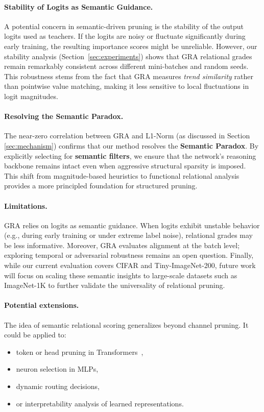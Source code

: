 \documentclass[sn-mathphys,Numbered]{sn-jnl}
\begin{document}
\paragraph{Stability of Logits as Semantic Guidance.}
A potential concern in semantic-driven pruning is the stability of the output logits used as teachers. If the logits are noisy or fluctuate significantly during early training, the resulting importance scores might be unreliable. However, our stability analysis (Section~\ref{sec:experiments}) shows that GRA relational grades remain remarkably consistent across different mini-batches and random seeds. This robustness stems from the fact that GRA measures \emph{trend similarity} rather than pointwise value matching, making it less sensitive to local fluctuations in logit magnitudes.

\paragraph{Resolving the Semantic Paradox.}
The near-zero correlation between GRA and L1-Norm (as discussed in Section \ref{sec:mechanism}) confirms that our method resolves the \textbf{Semantic Paradox}. By explicitly selecting for \textbf{semantic filters}, we ensure that the network's reasoning backbone remains intact even when aggressive structural sparsity is imposed. This shift from magnitude-based heuristics to functional relational analysis provides a more principled foundation for structured pruning.

\paragraph{Limitations.}
GRA relies on logits as semantic guidance.
When logits exhibit unstable behavior (e.g., during early training or under extreme label noise), relational grades may be less informative.
Moreover, GRA evaluates alignment at the batch level; exploring temporal or adversarial robustness remains an open question.
Finally, while our current evaluation covers CIFAR and Tiny-ImageNet-200, future work will focus on scaling these semantic insights to large-scale datasets such as ImageNet-1K to further validate the universality of relational pruning.

\paragraph{Potential extensions.}
The idea of semantic relational scoring generalizes beyond channel pruning.
It could be applied to:
\begin{itemize}
    \item token or head pruning in Transformers~\cite{xia2022structured,khaki2024need},
    \item neuron selection in MLPs,
    \item dynamic routing decisions,
    \item or interpretability analysis of learned representations.
\end{itemize}
\end{document}
